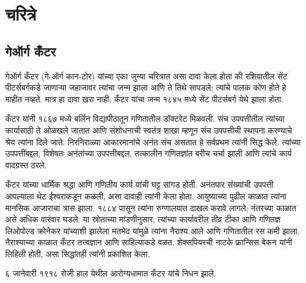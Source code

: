 \chapter{चरित्रे}\label{his:bio:chap}










\section{गेऑर्ग कँटर}\label{his:bio:can:sec}



गेऑर्ग कँटर (\textsc{गे}-ऑर्ग \textsc{कान}-टोर) यांच्या एका जुन्या चरित्रात असा दावा केला होता की रशियातील सेंट पीटर्सबर्गकडे जाणाऱ्या जहाजावर त्यांचा जन्म झाला आणि ते तिथे सापडले; त्यांचे पालक कोण होते हे माहीत नव्हते. मात्र हा दावा खरा नाही. कँटर यांचा जन्म १८४५ मध्ये सेंट पीटर्सबर्ग येथे झाला होता.

कँटर यांनी १८६७ मध्ये बर्लिन विद्यापीठातून गणितातील डॉक्टरेट मिळवली. संच उपपत्तीतील त्यांच्या कार्यासाठी ते ओळखले जातात आणि संशोधनाची स्वतंत्र शाखा म्हणून संच उपपत्तीची स्थापना करण्याचे श्रेय त्यांना दिले जाते. निरनिराळ्या आकारमानांचे अनंत संच असतात हे सर्वप्रथम त्यांनी सिद्ध केले. त्यांच्या उपपत्तींबद्दल, विशेषतः अनंतांच्या उपपत्तीबद्दल, तत्कालीन गणितज्ञांत बरीच चर्चा झाली आणि त्यांचे कार्य वादग्रस्त ठरले.

कँटर यांच्या धार्मिक श्रद्धा आणि गणितीय कार्य यांची घट्ट सांगड होती. अनंतपार संख्यांची उपपत्ती आपल्याला थेट ईश्वराकडून कळली, असा दावाही त्यांनी केला होता. आयुष्याच्या पुढील काळात त्यांना मानसिक आजाराचा त्रास झाला. १८८४ पासून त्यांना रुग्णालयात दाखल करावे लागले; नंतरच्या काळात असे अधिक वारंवार घडले. या स्रोताच्या मांडणीनुसार, त्यांच्या कार्यावरील तीव्र टीका आणि गणितज्ञ लिओपोल्ड क्रोनेकर यांच्याशी झालेला मतभेद यांमुळे त्यांना नैराश्य आले आणि गणितातील रस कमी झाला. नैराश्याच्या काळात कँटर तत्त्वज्ञान आणि साहित्याकडे वळत. शेक्सपियरची नाटके फ्रान्सिस बेकन यांनी लिहिली होती, असा सिद्धांतही त्यांनी प्रकाशित केला.

६ जानेवारी १९१८ रोजी हाल येथील आरोग्यधामात कँटर यांचे निधन झाले.

